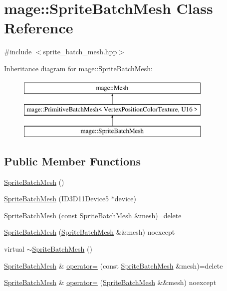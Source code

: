 \hypertarget{classmage_1_1_sprite_batch_mesh}{}\section{mage\+:\+:Sprite\+Batch\+Mesh Class Reference}
\label{classmage_1_1_sprite_batch_mesh}


{\ttfamily \#include $<$sprite\+\_\+batch\+\_\+mesh.\+hpp$>$}

Inheritance diagram for mage\+:\+:Sprite\+Batch\+Mesh\+:\begin{figure}[H]
\begin{center}
\leavevmode
\includegraphics[height=3.000000cm]{classmage_1_1_sprite_batch_mesh}
\end{center}
\end{figure}
\subsection*{Public Member Functions}
\begin{DoxyCompactItemize}
\item 
\hyperlink{classmage_1_1_sprite_batch_mesh_ae5b2219aa3d5bbfb216036dad9c12e5d}{Sprite\+Batch\+Mesh} ()
\item 
\hyperlink{classmage_1_1_sprite_batch_mesh_a3df41f79eb6080be26acceb4d283a913}{Sprite\+Batch\+Mesh} (I\+D3\+D11\+Device5 $\ast$device)
\item 
\hyperlink{classmage_1_1_sprite_batch_mesh_a06615b441ee7cc03d4a50e2f29c4be46}{Sprite\+Batch\+Mesh} (const \hyperlink{classmage_1_1_sprite_batch_mesh}{Sprite\+Batch\+Mesh} \&mesh)=delete
\item 
\hyperlink{classmage_1_1_sprite_batch_mesh_a449601f328db56e11d93e9f4ecb1015b}{Sprite\+Batch\+Mesh} (\hyperlink{classmage_1_1_sprite_batch_mesh}{Sprite\+Batch\+Mesh} \&\&mesh) noexcept
\item 
virtual \hyperlink{classmage_1_1_sprite_batch_mesh_a4f9ad5d0d58722499b9e7ddfac3312c9}{$\sim$\+Sprite\+Batch\+Mesh} ()
\item 
\hyperlink{classmage_1_1_sprite_batch_mesh}{Sprite\+Batch\+Mesh} \& \hyperlink{classmage_1_1_sprite_batch_mesh_a6b2b8f8aca90b9bb1967e6cdbf4d06da}{operator=} (const \hyperlink{classmage_1_1_sprite_batch_mesh}{Sprite\+Batch\+Mesh} \&mesh)=delete
\item 
\hyperlink{classmage_1_1_sprite_batch_mesh}{Sprite\+Batch\+Mesh} \& \hyperlink{classmage_1_1_sprite_batch_mesh_a2a9c60b7000d68649ac0eb5a08626795}{operator=} (\hyperlink{classmage_1_1_sprite_batch_mesh}{Sprite\+Batch\+Mesh} \&\&mesh) noexcept
\end{DoxyCompactItemize}
